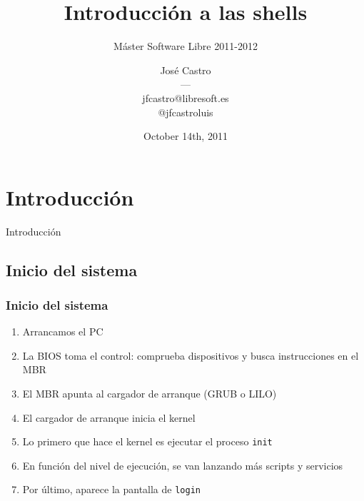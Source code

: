\documentclass{beamer}
\begin{document}
\title{Introducción a las shells}
\subtitle{Máster Software Libre 2011-2012}
\author{José Castro \\ --- \\ \tiny{jfcastro@libresoft.es \\ @jfcastroluis}}
\date{October 14th, 2011}

\frame{
\maketitle
}



\section{Introducción}
\begin{frame}
  \begin{center}
    \huge{Introducción}
  \end{center}
\end{frame}

\subsection{Inicio del sistema}

\begin{frame}
  \frametitle{Inicio del sistema}
  \begin{enumerate}
    \item Arrancamos el PC
    \item La BIOS toma el control: comprueba dispositivos y busca instrucciones en el MBR
    \item El MBR apunta al cargador de arranque (GRUB o LILO)
    \item El cargador de arranque inicia el kernel
    \item Lo primero que hace el kernel es ejecutar el proceso \texttt{init}
    \item En función del nivel de ejecución, se van lanzando más scripts y servicios
    \item Por último, aparece la pantalla de \texttt{login}
  \end{enumerate}
\end{frame}
\end{document}
